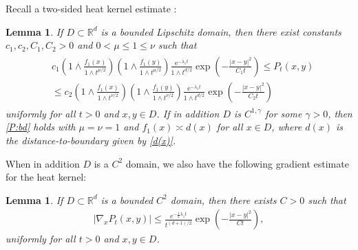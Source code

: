 \documentclass[reqno]{amsart}
\newcommand{\R}{\mathbb R}
\renewcommand{\d}{\mathrm d}
\newcommand{\e}{\mathrm e}
\newcommand{\1}{\mathbf 1}
\numberwithin{equation}{section}
\newtheorem{lemma}[theorem]{Lemma}
\theoremstyle{definition}
\begin{document}
Recall a two-sided heat kernel estimate \cite{Riahi}:
\begin{lemma}\label{lem:P}
    If $D \subset \R^d$ is a bounded Lipschitz domain, then there exist constants $c_1,c_2,C_1,C_2>0$ and $0<\mu \le 1 \le \nu$ such that
    \begin{align}\begin{split}\label{P:bd}
        &c_1\left( 1\wedge \frac{f_1(x)}{1 \wedge t^{\mu/2}} \right)\left( 1\wedge \frac{f_1(y)}{1 \wedge t^{\mu/2}} \right) \frac{\e^{-\lambda_1 t}}{1\wedge t^{d/2}}
        \exp\left(-\frac{|x-y|^2}{C_1t}\right)
        \le P_t(x,y) \\
        &
        \le c_2 \left( 1\wedge \frac{f_1(x)}{1 \wedge t^{\nu/2}} \right)\left( 1\wedge \frac{f_1(y)}{1 \wedge t^{\nu/2}} \right) \frac{\e^{-\lambda_1 t}}{1\wedge t^{d/2}}
        \exp\left(-\frac{|x-y|^2}{C_2t}\right)
    \end{split}\end{align}
    uniformly for all $t>0$ and $x,y \in D$. If in addition $D$ is $C^{1,\gamma}$ for some $\gamma>0$, then \eqref{P:bd} holds with $\mu=\nu=1$ and $f_1(x) \asymp d(x)$ for all $x \in D$, where $d(x)$ is the distance-to-boundary given by \eqref{d(x)}.
\end{lemma}

When in addition $D$ is a $C^2$ domain, we also have the following gradient estimate for the heat kernel:

\begin{lemma}\label{lem:grad:P}
If $D \subset \R^d$ is a bounded $C^2$ domain, then there exists $C>0$ such that
\begin{align*}
	|\nabla_x P_t(x,y)| \le \frac{e^{-\frac12 \lambda_1 t}}{t^{(d+1)/2}} \exp\left(-\frac{|x-y|^2}{Ct}\right),
\end{align*}
uniformly for all $t>0$ and $x,y \in D$.
\end{lemma}
\end{document}
